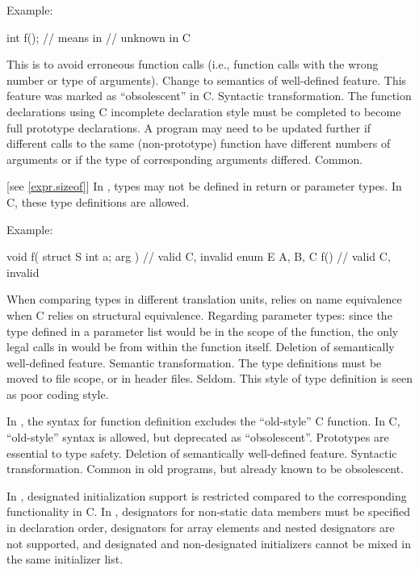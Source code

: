 Example:
\begin{codeblock}
int f();            // means    in \Cpp{}
                    //  unknown \tcode{)} in C
\end{codeblock}

\rationale
This is to avoid erroneous function calls (i.e., function calls
with the wrong number or type of arguments).
\effect
Change to semantics of well-defined feature.
This feature was marked as ``obsolescent'' in C.
\difficulty
Syntactic transformation.
The function declarations using C incomplete declaration style must
be completed to become full prototype declarations.
A program may need to be updated further if different calls to the
same (non-prototype) function have different numbers of arguments or
if the type of corresponding arguments differed.
\howwide
Common.

 [see \ref{expr.sizeof}]
\change
In \Cpp{}, types may not be defined in return or parameter types.
In C, these type definitions are allowed.

Example:
\begin{codeblock}
void f( struct S { int a; } arg ) {}    // valid C, invalid \Cpp{}
enum E { A, B, C } f() {}               // valid C, invalid \Cpp{}
\end{codeblock}

\rationale
When comparing types in different translation units, \Cpp{} relies
on name equivalence when C relies on structural equivalence.
Regarding parameter types: since the type defined in a parameter list
would be in the scope of the function, the only legal calls in \Cpp{}
would be from within the function itself.
\effect
Deletion of semantically well-defined feature.
\difficulty
Semantic transformation.
The type definitions must be moved to file scope, or in header files.
\howwide
Seldom.
This style of type definition is seen as poor coding style.

\change
In \Cpp{}, the syntax for function definition excludes the ``old-style'' C function.
In C, ``old-style'' syntax is allowed, but deprecated as ``obsolescent''.
\rationale
Prototypes are essential to type safety.
\effect
Deletion of semantically well-defined feature.
\difficulty
Syntactic transformation.
\howwide
Common in old programs, but already known to be obsolescent.

\change
In \Cpp{}, designated initialization support is restricted
compared to the corresponding functionality in C\@.
In \Cpp{},
designators for non-static data members
must be specified in declaration order,
designators for array elements and nested designators
are not supported,
and
designated and non-designated initializers
cannot be mixed in the same initializer list.


